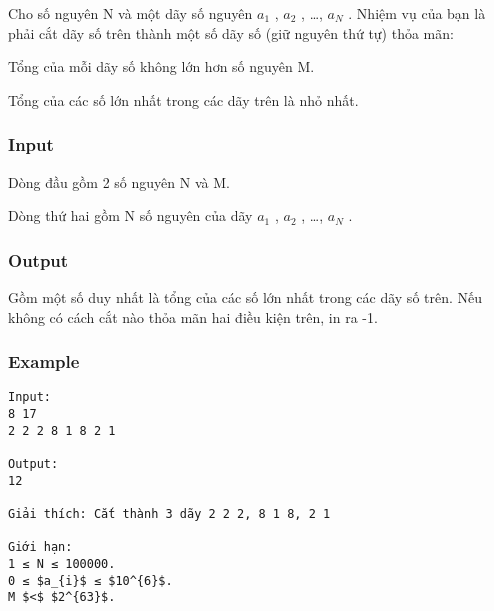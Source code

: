 



   Cho số nguyên N và một dãy số nguyên $a_{1}$   , $a_{2}$   , …, $a_{N}$   . Nhiệm vụ của bạn là phải cắt dãy số trên thành một số dãy số (giữ nguyên thứ tự) thỏa mãn:  

   Tổng của mỗi dãy số không lớn hơn số nguyên M.  

   Tổng của các số lớn nhất trong các dãy trên là nhỏ nhất.  

\subsubsection{   Input  }

   Dòng đầu gồm 2 số nguyên N và M.  

   Dòng thứ hai gồm N số nguyên của dãy $a_{1}$   , $a_{2}$   , …, $a_{N}$   .  

\subsubsection{   Output  }

   Gồm một số duy nhất là tổng của các số lớn nhất trong các dãy số trên. Nếu không có cách cắt nào thỏa mãn hai điều kiện trên, in ra -1.  

\subsubsection{   Example  }
\begin{verbatim}
Input:
8 17
2 2 2 8 1 8 2 1

Output:
12

Giải thích: Cắt thành 3 dãy 2 2 2, 8 1 8, 2 1

Giới hạn:
1 ≤ N ≤ 100000.
0 ≤ $a_{i}$ ≤ $10^{6}$.
M $<$ $2^{63}$.

\end{verbatim}
